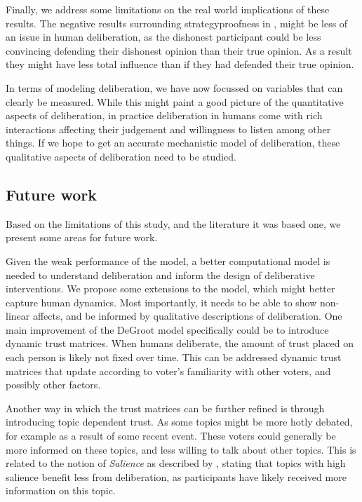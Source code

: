 Finally, we address some limitations on the real world implications of these results.
The negative results surrounding strategyproofness in , might be less
of an issue in human deliberation, as the dishonest participant could be less convincing
defending their dishonest opinion than their true opinion. As a result they might have less
total influence than if they had defended their true opinion. 

In terms of modeling deliberation, we have now focussed on variables that can
clearly be measured. While this might paint a good picture of the quantitative
aspects of deliberation, in practice deliberation in humans come with rich interactions
affecting their judgement and willingness to listen among other things. If we hope to 
get an accurate mechanistic model of deliberation, these qualitative aspects of deliberation
need to be studied.









\subsection{Future work}

Based on the limitations of this study, and the literature it was based one, we present some areas for future work.

Given the weak performance of the model, a better computational model is needed
to understand deliberation and inform the design of deliberative interventions.
We propose some extensions to the model, which might better capture human
dynamics. Most importantly, it needs to be able to show non-linear affects, and
be informed by qualitative descriptions of deliberation. One main improvement of the DeGroot model specifically could be to introduce dynamic trust matrices.
When humans deliberate, the amount of trust placed on each person is likely not
fixed over time. This can be addressed dynamic trust matrices that update according
to voter's familiarity with other voters, and possibly other factors.

Another way in which the trust matrices can be further refined is through
introducing topic dependent trust. As some topics might be more hotly debated,
for example as a result of some recent event. These voters could generally be
more informed on these topics, and less willing to talk about other topics.
This is related to the notion of \textit{Salience} as described by
\citet{listDeliberationSinglePeakednessPossibility2013}, stating that topics
with high salience benefit less from deliberation, as participants have likely
received more information on this topic.

